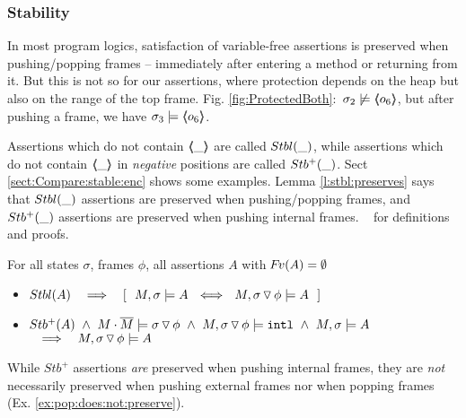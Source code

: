 \subsubsection{\textbf{Stability}} %
\label{s:preserve:call:ret}
In most program logics, satisfaction of  variable-free assertions  is preserved when pushing/popping frames
-- \ie immediately after entering a method or  returning from it.
But this is not  so for our assertions, where protection depends %
on the heap but also 
on the range of %
the top frame. \Eg  Fig. \ref{fig:ProtectedBoth}:\  
$\sigma_2 \not\models \langle\!\!\langle o_6 \rangle\!\!\rangle$, but after pushing a frame, we have $\sigma_3  \models \langle\!\!\langle o_6 \rangle\!\!\rangle$.
 
 

{Assertions} which do  not contain  $\langle\!\!\langle \_ \rangle\!\!\rangle$   are called ${Stbl( \_ )}$, 
while assertions which do  not contain $\langle\!\!\langle \_ \rangle\!\!\rangle$ in \emph{negative} positions are called ${Stb^+( \_ )}$. 
Sect \ref{sect:Compare:stable:enc} shows some examples.
Lemma \ref{l:stbl:preserves} says that ${Stbl( \_ )}$ assertions are  preserved when pushing/popping frames,
and ${Stb^+( \_ )}$ assertions are preserved when pushing  {internal} frames.
\Cf    \A\ \aref{D}{\ref{app:preserve}} for   definitions and proofs. 

\begin{lemma}
For all  states $\sigma$, frames $\phi$,   all assertions $A$ with  ${\hspace{-1pt}F\hspace{-1pt}}v(A)=\emptyset $
\label{l:preserve:asrt}
\label{l:stbl:preserves} 
\begin{itemize}
\item 
$\Stable{A} \  \ \  \Longrightarrow  \  \ \  [\ \ M, \sigma \models A \ \ \Longleftrightarrow \ \  M,{\PushSLong \phi \sigma} \models A\ \ ]$
\item 
\label{l:preserve:asrt:two}
${Stb^+( A )}   \ \wedge    \ {M\cdot\overline{M} \models {\ensuremath{ \sigma \, {\triangledown}\, \phi}}}\  \wedge\  M, { \sigma \, {\triangledown}\, \phi} \models  \mbox{\normalfont{\texttt{intl}}}\  \wedge  \ M, \sigma \models A $
$\  \ \ \Longrightarrow \ \  \ M,{ \sigma \, {\triangledown}\, \phi} \models A\ $
\end{itemize}
\end{lemma}


While $Stb^+$ assertions \emph{are} preserved  when pushing  internal frames,   they  are \emph{not} necessarily preserved when pushing  external frames  
nor when popping frames   (\cf Ex. \ref{ex:pop:does:not:preserve}). 

